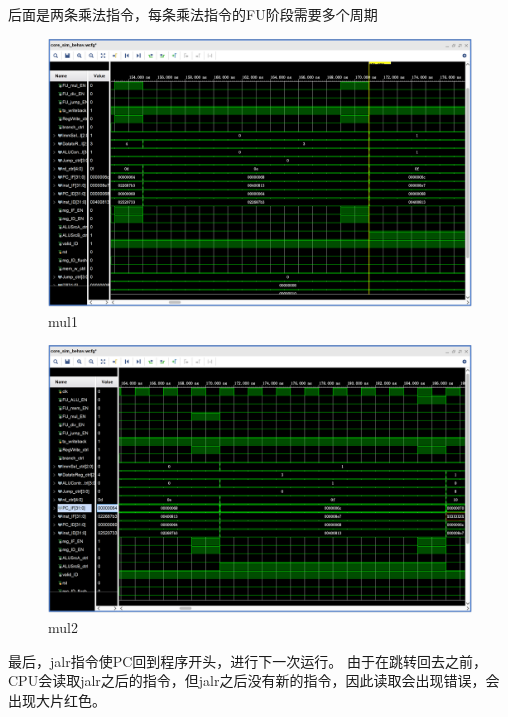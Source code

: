 后面是两条乘法指令，每条乘法指令的FU阶段需要多个周期

\begin{figure}[H]
    \centering
    \includegraphics[width=1.0\textwidth]{figs/7.png}
    \caption{mul1}
    \label{Fig.10}
\end{figure}

\begin{figure}[H]
	\centering
	\includegraphics[width=1.0\textwidth]{figs/9.png}
	\caption{mul2}
	\label{Fig.12}
\end{figure}

最后，jalr指令使PC回到程序开头，进行下一次运行。
由于在跳转回去之前，CPU会读取jalr之后的指令，但jalr之后没有新的指令，因此读取会出现错误，会出现大片红色。

